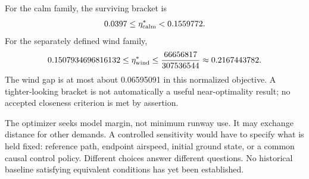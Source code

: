 For the calm family, the surviving bracket is
\[
0.0397\leq\eta^*_{\rm calm}<0.1559772.
\]
For the separately defined wind family,
\[
0.1507934696816132\leq\eta^*_{\rm wind}
\leq\frac{66656817}{307536544}\approx0.2167443782.
\]
The wind gap is at most about 0.06595091 in this normalized objective. A tighter-looking bracket is not automatically a useful near-optimality result; no accepted closeness criterion is met by assertion.

The optimizer seeks model margin, not minimum runway use. It may exchange distance for other demands. A controlled sensitivity would have to specify what is held fixed: reference path, endpoint airspeed, initial ground state, or a common causal control policy. Different choices answer different questions. No historical baseline satisfying equivalent conditions has yet been established.
\clearpage
